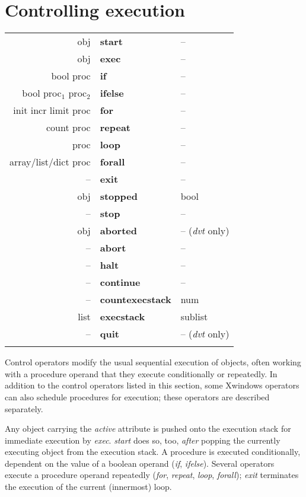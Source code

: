 \section{Controlling execution}

\begin{tabular}{>{\sffamily}r>{\sffamily\bfseries}l>{\sffamily}l}
obj & start & --\\
obj & exec & --\\
bool proc & if & --\\
bool proc$_1$ proc$_2$ & ifelse & --\\
init incr limit proc & for & --\\
count proc & repeat & --\\
proc & loop & --\\
array/list/dict proc & forall & --\\
-- & exit & --\\
obj & stopped & bool\\
-- & stop & --\\
obj & aborted & --  (\emph{dvt} only)\\
-- & abort & --\\
-- & halt & --\\
-- & continue & --\\
-- & countexecstack & num\\
list & execstack & sublist\\
-- & quit & -- (\emph{dvt} only)\\\\
\end{tabular}

Control operators modify the usual sequential  execution  of objects,  often working with a procedure operand that they execute conditionally or repeatedly. In addition to the control operators listed in this section, some Xwindows operators can also schedule procedures for execution; these operators are described separately.

Any  object  carrying the \emph{active} attribute is pushed onto  the  execution stack for immediate execution by \emph{exec}. \emph{start} does so, too, \emph{after} popping the currently executing object from the execution stack. A procedure is  executed conditionally,  dependent on the value of a boolean operand (\emph{if}, \emph{ifelse}). Several  operators execute a procedure operand  repeatedly  (\emph{for}, \emph{repeat}, \emph{loop}, \emph{forall});  \emph{exit} terminates the execution of the current (innermost) loop.

